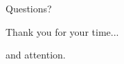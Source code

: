 \documentclass{beamer}
\begin{document}
\begin{darkframes}
    
        \begin{frame}{Questions?}
      \begin{block}
      {{Thank you for your time...}}
      {\begin{flushright}and attention.\end{flushright}}
      \end{block}
    \end{frame}

  \end{darkframes}
\end{document}
